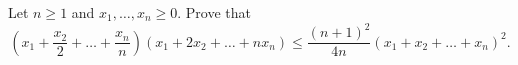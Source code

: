 Let $n \ge 1$ and $x_1, \ldots, x_n \ge 0$. Prove that$$  (x_1 + \frac{x_2}{2} + \ldots + \frac{x_n}{n}) (x_1 + 2x_2 + \ldots + nx_n) \le \frac{(n+1)^2}{4n} (x_1 + x_2 + \ldots + x_n)^2 .$$